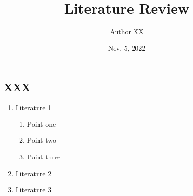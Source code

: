\documentclass[11pt]{article}
\title{Literature Review}
\author{Author XX}
\date{Nov. 5, 2022}
\numberwithin{equation}{section}
\begin{document}
\maketitle




\subsection*{XXX}

\begin{enumerate}%
  \item Literature 1
  \begin{enumerate}
    \item Point one
    \item Point two
    \item Point three
  \end{enumerate}
  \item Literature 2
  \item Literature 3
\end{enumerate}
\end{document}

